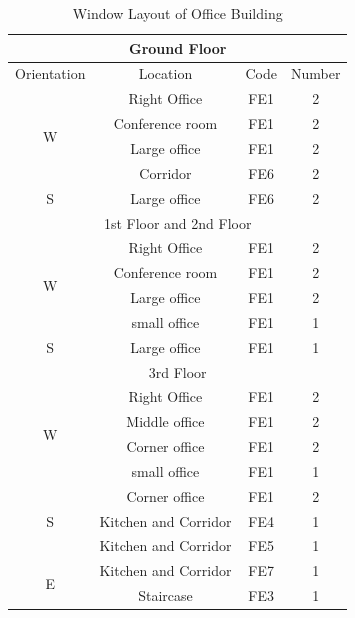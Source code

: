 \documentclass[11pt, a4paper]{article}
\theoremstyle{definition}
\begin{document}
				\begin{table}[H]
				\centering
				\caption{Window Layout of Office Building}
				\begin{tabular}{  c | c | c | c  }
					\hline
					\multicolumn{4}{c}{Ground Floor}\\
					\hline
					Orientation & Location & Code & Number \\ \hline
					\multirow{4}{*}{W} & Right Office & FE1 & 2 \\
					 & Conference room & FE1 & 2 \\
					 & Large office & FE1 & 2 \\
					 & Corridor & FE6 & 2 \\ \hline
					S & Large office & FE6 & 2 \\ \hline
					\multicolumn{4}{c}{1st Floor and 2nd Floor}\\\hline
					\multirow{4}{*}{W} & Right Office & FE1 & 2 \\ 
					 & Conference room & FE1 & 2 \\ 
					 & Large office & FE1 & 2 \\ 
					 & small office & FE1 & 1 \\ \hline
					S & Large office & FE1 & 1 \\ \hline
					\multicolumn{4}{c}{3rd Floor}\\ \hline
					\multirow{4}{*}{W} & Right Office & FE1 & 2 \\ 
					 & Middle office & FE1 & 2 \\ 
					 & Corner office & FE1 & 2 \\ 
					 & small office & FE1 & 1 \\ \hline
					\multirow{3}{*}{S} & Corner office & FE1 & 2 \\ 
					 & Kitchen and Corridor & FE4 & 1 \\ 
					 & Kitchen and Corridor & FE5 & 1 \\ \hline
					\multirow{2}{*}{E} & Kitchen and Corridor & FE7 & 1 \\ 
					 & Staircase & FE3 & 1 \\ \hline
				\end{tabular}
				\label{table:SumatraWindowLayout}
				\end{table}
\end{document}
